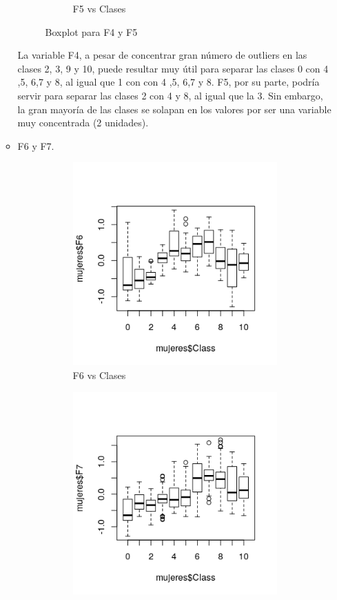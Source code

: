 \begin{itemize}
\begin{itemize}
\begin{figure}[H]
\begin{subfigure}{.5\textwidth}
				\caption{F5 vs Clases}
				\label{fig:bpmF5}
			\end{subfigure}
			\caption{Boxplot para F4 y F5}
			\label{fig:bpm45}
		\end{figure}
	
		La variable F4, a pesar de concentrar gran número de outliers en las clases 2, 3, 9 y 10, puede resultar muy útil para separar las clases 0 con 4 ,5, 6,7 y 8, al igual que 1 con con 4 ,5, 6,7 y 8. F5, por su parte, podría servir para separar las clases 2 con 4 y 8, al igual que la 3. Sin embargo, la gran mayoría de las clases se solapan en los valores por ser una variable muy concentrada (2 unidades).
		
		\item F6 y F7.
		
		\begin{figure}[H]
			\centering
			\begin{subfigure}{.5\textwidth}
				\centering
				\includegraphics[width=.8\linewidth]{bpmF6.png}
				\caption{F6 vs Clases}
				\label{fig:bpmF6}
			\end{subfigure}%
			\begin{subfigure}{.5\textwidth}
				\centering
				\includegraphics[width=.8\linewidth]{bpmF7.png}

\end{subfigure}
\end{figure}
\end{itemize}
\end{itemize}
